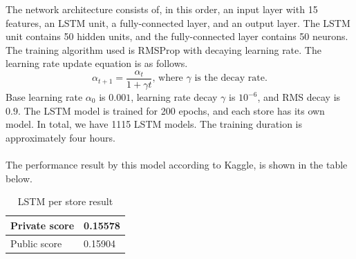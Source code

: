 The network architecture consists of, in this order, an input layer with 15 features, an LSTM unit, a fully-connected layer, and an output layer. The LSTM unit contains 50 hidden units, and the fully-connected layer contains 50 neurons. The training algorithm used is RMSProp with decaying learning rate. The learning rate update equation is as follows.
\begin{equation}
\label{eq:decay_lr}
\alpha_{t+1} = \frac{\alpha_t}{1 + \gamma t} \text{, where } \gamma \text{ is the decay rate.}
\end{equation}
Base learning rate $\alpha_0$ is $0.001$, learning rate decay $\gamma$ is $10^{-6}$, and RMS decay is $0.9$. The LSTM model is trained for 200 epochs, and each store has its own model. In total, we have 1115 LSTM models. The training duration is approximately four hours. \\ \\
The performance result by this model according to Kaggle, is shown in the table below.
\begin{table}[h]
	\centering
	\caption{LSTM per store result}
	\label{tab:lstm_result}
	\begin{tabular}{|m{100pt}|m{50pt}|}
		\hline
		Private score & 0.15578 \\ \hline
		Public score  & 0.15904 \\ \hline
	\end{tabular}
\end{table}